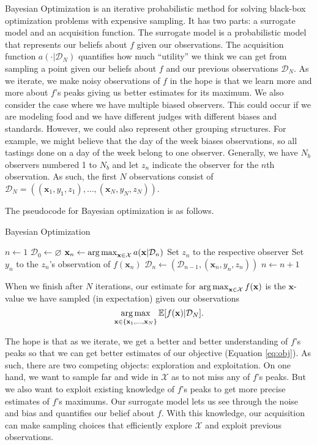 Bayesian Optimization is an iterative probabilistic method for solving black-box optimization problems with expensive sampling.
It has two parts: a surrogate model and an acquisition function.
The surrogate model is a probabilistic model that represents our beliefs about $f$ given our observations.
The acquisition function $a( \cdot | \mathcal{D}_N)$ quantifies how much ``utility'' we think we can get from sampling a point given our beliefs about $f$ and our previous observations $\mathcal{D}_N$.
As we iterate, we make noisy observations of $f$ in the hope is that we learn more and more about $f$'s peaks giving us better estimates for its maximum.
We also consider the case where we have multiple biased observers.
This could occur if we are modeling food and we have different judges with different biases and standards.
However, we could also represent other grouping structures.
For example, we might believe that the day of the week biases observations, so all tastings done on a day of the week belong to one observer.
Generally, we have $N_b$ observers numbered 1 to $N_b$ and let $z_n$ indicate the observer for the $n$th observation.
As such, the first $N$ observations consist of $\mathcal{D}_N = ((\mathbf{x}_1, y_1, z_1), \ldots, (\mathbf{x}_N, y_N, z_N))$.

The pseudocode for Bayesian optimization is as follows.
\begin{algorithm}
    \begin{algorithmic}
        \caption{Bayesian Optimization}
        \label{alg:bo}
        \State $n \gets 1$
        \State $\mathcal{D}_0 \gets \varnothing$
        \State $\mathbf{x}_n \gets \operatorname*{arg\,max}_{\mathbf{x} \in \mathcal{X}} a(\mathbf{x} | \mathcal{D}_n)$  
        \State Set $z_n$ to the respective observer
        \State Set $y_n$ to the $z_n$'s observation of $f(\mathbf{x}_n)$
        \State $\mathcal{D}_n \gets (\mathcal{D}_{n - 1}, (\mathbf{x}_n, y_n, z_n))$
        \State $n \gets n + 1$
        \EndWhile
    \end{algorithmic}
\end{algorithm}
When we finish after $N$ iterations, our estimate for $\operatorname*{arg\,max}_{\mathbf{x} \in \mathcal{X}}f(\mathbf{x})$ is
the $\mathbf{x}$-value we have sampled (in expectation) given our observations
\begin{equation*}
    \operatorname*{arg\,max}_{\mathbf{x} \in \{ \mathbf{x}_1, \dots, \mathbf{x}_N \} } \mathbb{E}[f(\mathbf{x}) | \mathcal{D}_N].
\end{equation*}

The hope is that as we iterate, we get a better and better understanding of $f$'s peaks so that we can get better estimates of our objective (Equation \ref{eq:obj}).
As such, there are two competing objects: exploration and exploitation.
On one hand, we want to sample far and wide in $\mathcal{X}$ as to not miss any of $f$'s peaks.
But we also want to exploit existing knowledge of $f$'s peaks to get more precise estimates of $f$'s maximums.
Our surrogate model lets us see through the noise and bias and quantifies our belief about $f$.
With this knowledge, our acquisition can make sampling choices that efficiently explore $\mathcal{X}$ and exploit previous observations.
